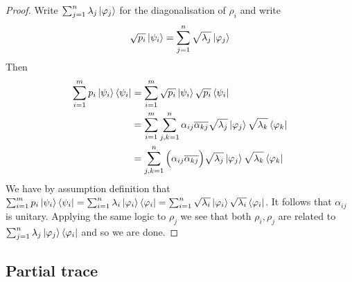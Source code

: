 \documentclass[12pt]{article}
\theoremstyle{plain}
\theoremstyle{definition}
\begin{document}
\begin{proof}
Write $\sum_{j = 1}^n \lambda_j \ket{\varphi_j}$ for the diagonalisation of $\rho_i$ and write
\begin{equation}
\sqrt{p_i}\ket{\psi_i} = \sum_{j = 1}^n \sqrt{\lambda_j}\ket{\varphi_j}
\end{equation}
Then
\begin{align*}
\sum_{i = 1}^m p_i \ket{\psi_i}\bra{\psi_i} &= \sum_{i = 1}^m \sqrt{p_i}\ket{\psi_i}\sqrt{p_i}\bra{\psi_i}\\
&= \sum_{i = 1}^m  \sum_{j,k = 1}^n\alpha_{ij}\overline{\alpha_{kj}}\sqrt{\lambda_j}\ket{\varphi_j}\sqrt{\lambda_k}\bra{\varphi_{k}}\\
&= \sum_{j,k = 1}^n \Big( \alpha_{ij}\overline{\alpha_{kj}}\Big)\sqrt{\lambda_j}\ket{\varphi_j}\sqrt{\lambda_k}\bra{\varphi_{k}}
\end{align*}
We have by assumption definition that $\sum_{i = 1}^m p_i \ket{\psi_i}\bra{\psi_i}  = \sum_{i = 1}^n \lambda_i \ket{\varphi_i}\bra{\varphi_i} = \sum_{i = 1}^n \sqrt{\lambda_i}\ket{\varphi_i}\sqrt{\lambda_i}\bra{\varphi_i}$. It follows that $\alpha_{ij}$ is unitary.  Applying the same logic to $\rho_j$ we see that both $\rho_i,\rho_j$ are related to $\sum_{j = 1}^n \lambda_j \ket{\varphi_j}\bra{\varphi_i}$ and so we are done.
\end{proof}



\subsection{Partial trace}
\end{document}
